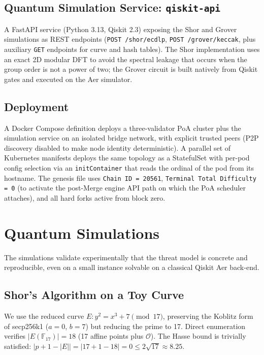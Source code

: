 \documentclass[journal,onecolumn,11pt]{IEEEtran}
\begin{document}
\subsection{Quantum Simulation Service: \texttt{qiskit-api}}

A FastAPI service (Python 3.13, Qiskit 2.3) exposing the Shor and Grover simulations as REST endpoints (\texttt{POST /shor/ecdlp}, \texttt{POST /grover/keccak}, plus auxiliary \texttt{GET} endpoints for curve and hash tables). The Shor implementation uses an exact 2D modular DFT to avoid the spectral leakage that occurs when the group order is not a power of two; the Grover circuit is built natively from Qiskit gates and executed on the Aer simulator.

\subsection{Deployment}

A Docker Compose definition deploys a three-validator PoA cluster plus the simulation service on an isolated bridge network, with explicit trusted peers (P2P discovery disabled to make node identity deterministic). A parallel set of Kubernetes manifests deploys the same topology as a StatefulSet with per-pod config selection via an \texttt{initContainer} that reads the ordinal of the pod from its hostname. The genesis file uses \texttt{Chain ID = 20561}, \texttt{Terminal Total Difficulty = 0} (to activate the post-Merge engine API path on which the PoA scheduler attaches), and all hard forks active from block zero.

\section{Quantum Simulations}
\label{sec:quantum}

The simulations validate experimentally that the threat model is concrete and reproducible, even on a small instance solvable on a classical Qiskit Aer back-end.

\subsection{Shor's Algorithm on a Toy Curve}
\label{sec:quantum_shor}

We use the reduced curve $E : y^2 = x^3 + 7 \pmod{17}$, preserving the Koblitz form of secp256k1 ($a = 0$, $b = 7$) but reducing the prime to 17. Direct enumeration verifies $|E(\mathbb{F}_{17})| = 18$ (17 affine points plus $\mathcal{O}$). The Hasse bound is trivially satisfied: $|p + 1 - |E|| = |17 + 1 - 18| = 0 \leq 2\sqrt{17} \approx 8.25$.
\end{document}
